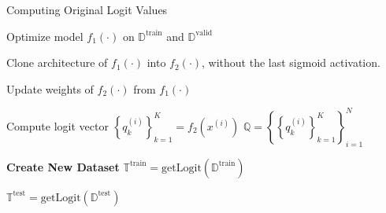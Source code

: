 \documentclass[final,1p,times,authoryear]{elsarticle}
\newenvironment{SgAlgorithm}[1][t]
{%
	\begin{algorithm2e}[#1]
    \linespread{1.5}
    \selectfont
}
{\end{algorithm2e}}
\begin{document}
\begin{SgAlgorithm}
    \caption{Computing Original Logit Values}\label{alg:taxonomy.logits}
    \BlankLine%

    {%
        Optimize model $f_1(\cdot)$ on $\mathbb{D}^{\text{train}}$ and $\mathbb{D}^{\text{valid}}$ \;

        Clone architecture of $f_1(\cdot)$ into $f_2(\cdot)$, without the last sigmoid activation. \;

        Update weights of $f_2(\cdot)$ from $f_1(\cdot)$
    }
    \BlankLine%

    {%
        {
            Compute logit vector ${\left\{ q_k^{(i)} \right\}}_{k=1}^K = f_2 \left(x^{(i)}\right)$
        }
        \BlankLine%
        ${\mathbb{Q}} = {\left\{ {\left\{ q_k^{(i)} \right\}}_{k=1}^K \right\}}_{i=1}^N$

    }
    \BlankLine%

    \textbf{Create New Dataset} \;
    ${\mathbb{T}}^\text{train} = \text{getLogit}(\mathbb{D}^\text{train})$ \;

    $\mathbb{T}^\text{test} = \text{getLogit}(\mathbb{D}^\text{test})$ \;
    \BlankLine%


\end{SgAlgorithm}
\end{document}
